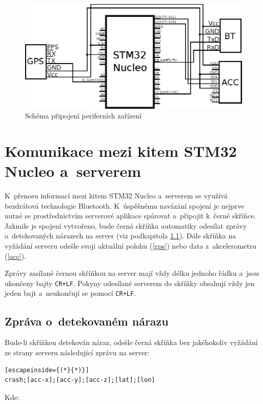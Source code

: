 \documentclass[a4paper,11pt,titlepage]{article}
\begin{document}
\begin{figure}[h]
\centering
\includegraphics[scale=1.1]{img/schema.eps}
\caption{Schéma připojení periferních zařízení}\end{figure}



\section{Komunikace mezi kitem STM32 Nucleo a~serverem}
\label{msgs}
K~přenosu informací mezi kitem STM32 Nucleo a~serverem se využívá bezdrátová technologie
Bluetooth. K~úspěšnému navázání spojení je nejprve nutné se prostřednictvím serverové aplikace
spárovat a~připojit k~černé skříňce. Jakmile je spojení vytvořeno, bude černá skříňka automatiky
odesílat zprávy o~detekovaných nárazech na server (viz podkapitola \ref{crash}).
Dále skříňka na vyžádání serveru odešle svoji aktuální polohu (\ref{gps}) nebo
data z~akcelerometru (\ref{acc}).

Zprávy zasílané černou skříňkou na server mají vždy délku jednoho řádku a~jsou ukončeny
bajty \texttt{CR+LF}.
Pokyny odesílané serverem do skříňky obsahují vždy jen jeden bajt a~neukončují se pomocí \texttt{CR+LF}.

\subsection{Zpráva o~detekovaném nárazu}
\label{crash}
Bude-li skříňkou detekován náraz, odešle černá skříňka bez jakéhokoliv vyžádání
ze strany serveru následující zprávu na server:

\begin{lstlisting}[escapeinside={(*}{*)}]
crash;[acc-x];[acc-y];[acc-z];[lat];[lon]
\end{lstlisting}

Kde:
\end{document}
